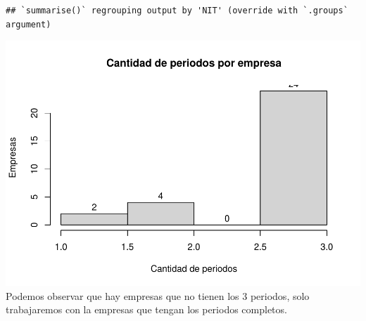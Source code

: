 \documentclass[
  11pt,
]{article}
\newenvironment{Shaded}{\begin{snugshade}}{\end{snugshade}}
\newcommand{\DataTypeTok}[1]{\textcolor[rgb]{0.13,0.29,0.53}{#1}}
\newcommand{\DecValTok}[1]{\textcolor[rgb]{0.00,0.00,0.81}{#1}}
\newcommand{\FloatTok}[1]{\textcolor[rgb]{0.00,0.00,0.81}{#1}}
\newcommand{\KeywordTok}[1]{\textcolor[rgb]{0.13,0.29,0.53}{\textbf{#1}}}
\newcommand{\NormalTok}[1]{#1}
\newcommand{\OperatorTok}[1]{\textcolor[rgb]{0.81,0.36,0.00}{\textbf{#1}}}
\newcommand{\StringTok}[1]{\textcolor[rgb]{0.31,0.60,0.02}{#1}}
\begin{document}
\begin{verbatim}
## `summarise()` regrouping output by 'NIT' (override with `.groups` argument)
\end{verbatim}

\begin{Shaded}
\end{Shaded}

\includegraphics{index_files/figure-latex/unnamed-chunk-29-1.pdf}
Podemos observar que hay empresas que no tienen los 3 periodos, solo
trabajaremos con la empresas que tengan los periodos completos.

\begin{Shaded}
\end{Shaded}
\end{document}
